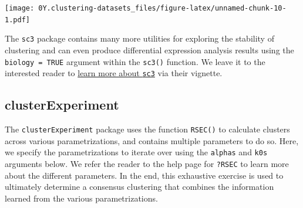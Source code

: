 \documentclass[]{book}
\newenvironment{Shaded}{\begin{snugshade}}{\end{snugshade}}
\newcommand{\DataTypeTok}[1]{\textcolor[rgb]{0.13,0.29,0.53}{#1}}
\newcommand{\DecValTok}[1]{\textcolor[rgb]{0.00,0.00,0.81}{#1}}
\newcommand{\FloatTok}[1]{\textcolor[rgb]{0.00,0.00,0.81}{#1}}
\newcommand{\KeywordTok}[1]{\textcolor[rgb]{0.13,0.29,0.53}{\textbf{#1}}}
\newcommand{\NormalTok}[1]{#1}
\newcommand{\OperatorTok}[1]{\textcolor[rgb]{0.81,0.36,0.00}{\textbf{#1}}}
\newcommand{\StringTok}[1]{\textcolor[rgb]{0.31,0.60,0.02}{#1}}
\begin{document}
\texttt{[image: 0Y.clustering-datasets\_files/figure-latex/unnamed-chunk-10-1.pdf]}

The \texttt{sc3} package contains many more utilities for exploring the stability of clustering and can even produce differential expression analysis results using the \texttt{biology\ =\ TRUE} argument within the \texttt{sc3()} function. We leave it to the interested reader to \href{https://bioconductor.org/packages/release/bioc/html/SC3.html}{learn more about \texttt{sc3}} via their vignette.

\hypertarget{clusterexperiment}{%
\subsection{clusterExperiment}\label{clusterexperiment}}

The \texttt{clusterExperiment} package uses the function \texttt{RSEC()} to calculate clusters across various parametrizations, and contains multiple parameters to do so. Here, we specify the parametrizations to iterate over using the \texttt{alphas} and \texttt{k0s} arguments below. We refer the reader to the help page for \texttt{?RSEC} to learn more about the different parameters. In the end, this exhaustive exercise is used to ultimately determine a consensus clustering that combines the information learned from the various parametrizations.

\begin{Shaded}
\end{Shaded}
\end{document}
